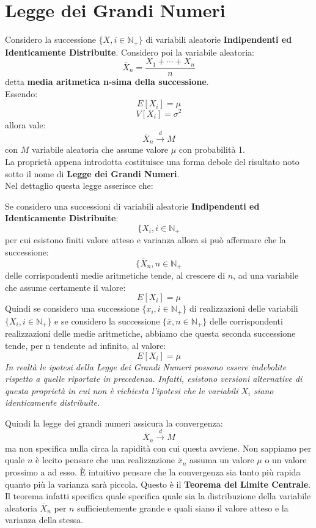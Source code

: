 \documentclass[a4paper,12pt, oneside]{book}
\newcommand{\numberset}{\mathbb}
\newcommand{\N}{\numberset{N}}
\begin{document}
\section{Legge dei Grandi Numeri}
Considero la successione $\{X,i\in\mathbb{N}_+\}$ di variabili aleatorie \textbf{Indipendenti ed Identicamente Distribuite}. Considero poi la variabile aleatoria:
\[\overline{X}_n=\frac{X_1+\cdots+X_n}{n}\]
detta \textbf{media aritmetica n-sima della successione}.\\
Essendo:
\[E[X_i]=\mu\]
\[V[X_i]=\sigma^2\]
allora vale:
\[\overline{X}_n\stackrel{d}{\longrightarrow}M\]
con $M$ variabile aleatoria che assume valore $\mu$ con probabilità 1.\\
La proprietà appena introdotta costituisce una forma debole del risultato noto sotto il nome di \textbf{Legge dei Grandi Numeri}.\\
Nel dettaglio questa legge asserisce che:
\begin{shaded}
Se considero una successioni di variabili aleatorie \textbf{Indipendenti ed Identicamente Distribuite}:
\[\{X_i,i\in\N_+\]
per cui esistono finiti valore atteso e varianza allora si può affermare che la successione:
\[\{\overline{X}_n,n\in\N_+\]
delle corrispondenti medie aritmetiche tende, al crescere di $n$, ad una variabile che assume certamente il valore:
\[E[X_i]=\mu\]
Quindi se considero una successione $\{x_i,i\in\N_+\}$ di realizzazioni delle variabili $\{X_i, i\in\N_+\}$ e se considero la successione $\{\overline{x},n\in\N_+\}$ delle corrispondenti realizzazioni delle medie aritmetiche, abbiamo che questa seconda successione tende, per n tendente ad infinito, al valore:
\[E[X_i]=\mu\]
\textit{In realtà le ipotesi della Legge dei Grandi Numeri possono essere indebolite
rispetto a quelle riportate in precedenza.
Infatti, esistono versioni alternative di questa proprietà in cui non è richiesta l'ipotesi che le variabili $X_i$ siano identicamente distribuite.}
\end{shaded}
Quindi la legge dei grandi numeri assicura la convergenza:
\[\overline{X}_n\stackrel{d}{\longrightarrow}M\]
ma non specifica nulla circa la rapidità con cui questa avviene. Non sappiamo per quale $n$ è lecito pensare che una realizzazione $\overline{x}_n$ assuma un valore $\mu$ o un valore prossimo a ad esso. È intuitivo pensare che la convergenza sia tanto più rapida quanto più la varianza sarà
piccola. Questo è il \textbf{Teorema del Limite Centrale}. Il teorema infatti specifica quale specifica quale sia la distribuzione della variabile aleatoria $\overline{X}_n$ per $n$ sufficientemente grande e quali siano il valore atteso e la varianza della stessa. \\
\end{document}
